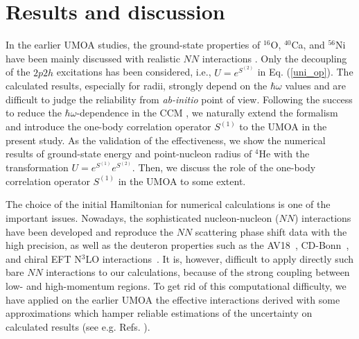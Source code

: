 \documentclass[aps,prc, dvips, twocolumn,groupedaddress,showkeys,showpacs,floatfix,superscriptaddress]{revtex4-1}
\newcommand{\<}{\langle}
\renewcommand{\>}{\rangle}
\begin{document}
\section{\label{sec:res}Results and discussion}
In the earlier UMOA studies, the ground-state properties of $^{16}$O, $^{40}$Ca, and $^{56}$Ni have been mainly discussed with
realistic $NN$ interactions \cite{Suzuki:1994, Fujii:2004, Fujii:2009, Miyagi:2015, Miyagi:2014}.
Only the decoupling of the $2p2h$ excitations has been considered, i.e.,  $U = e^{S^{(2)}}$ in Eq. (\ref{uni_op}).
The calculated results, especially for radii, strongly depend on the $\hbar\omega$ values
and are difficult to judge the reliability from {\it ab-initio} point of view.
Following the success to reduce the $\hbar\omega$-dependence in the CCM \cite{Kohno:2012},
 we naturally extend the formalism and introduce the one-body correlation
 operator $S^{(1)}$ to the UMOA in the present study.
As the validation of the effectiveness, we show the numerical results of ground-state energy
and point-nucleon radius of $^{4}$He
 with the transformation $U = e^{S^{(1)}}e^{S^{(2)}}$.
 Then, we discuss the role of the one-body correlation operator $S^{(1)}$ in the UMOA to some extent.

The choice of the initial Hamiltonian for numerical calculations is one of the important issues.
Nowadays, the sophisticated nucleon-nucleon ($NN$) interactions have been developed and
 reproduce the $NN$ scattering phase shift data with the high precision,
 as well as the deuteron properties such as the AV18~\cite{Wiringa:1995}, CD-Bonn~\cite{Machleidt:2001},
  and chiral EFT N$^{3}$LO interactions~\cite{Entem:2003}.
It is, however, difficult to apply directly such bare $NN$ interactions to our calculations,
 because of the strong coupling between low- and high-momentum regions.
To get rid of this computational difficulty, we have applied on the earlier UMOA the
 effective interactions derived with some approximations
which hamper reliable estimations of the uncertainty on calculated results
 (see e.g. Refs. \cite{Suzuki:1994,Fujii:2004}).
\end{document}
